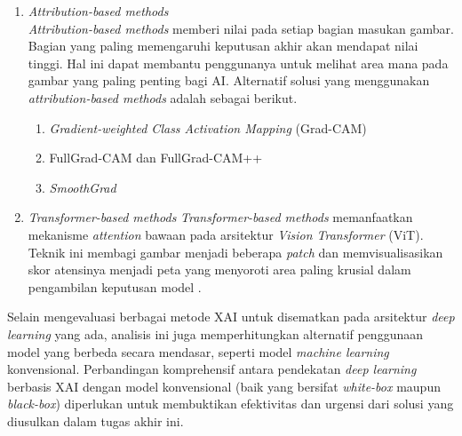 \begin{enumerate}
	\item \textit{Attribution-based methods} \\
	\textit{Attribution-based methods} memberi nilai pada setiap bagian masukan gambar. Bagian yang paling memengaruhi keputusan akhir akan mendapat nilai tinggi. Hal ini dapat membantu penggunanya untuk melihat area mana pada gambar yang paling penting bagi AI. Alternatif solusi yang menggunakan \textit{attribution-based methods} adalah sebagai berikut.
	\begin{enumerate}
		\item \textit{Gradient-weighted Class Activation Mapping} (Grad-CAM)
		
		\item FullGrad-CAM dan FullGrad-CAM++
		
		\item \textit{SmoothGrad}
	\end{enumerate}
	
	\item \textit{Transformer-based methods}
	\textit{Transformer-based methods} memanfaatkan mekanisme \textit{attention} bawaan pada arsitektur \textit{Vision Transformer} (ViT). Teknik ini membagi gambar menjadi beberapa \textit{patch} dan memvisualisasikan skor atensinya menjadi peta yang menyoroti area paling krusial dalam pengambilan keputusan model \autocite{iftikhar2025explainable}.
\end{enumerate}

Selain mengevaluasi berbagai metode XAI untuk disematkan pada arsitektur \textit{deep learning} yang ada, analisis ini juga memperhitungkan alternatif penggunaan model yang berbeda secara mendasar, seperti model \textit{machine learning} konvensional. Perbandingan komprehensif antara pendekatan \textit{deep learning} berbasis XAI dengan model konvensional (baik yang bersifat \textit{white-box} maupun \textit{black-box}) diperlukan untuk membuktikan efektivitas dan urgensi dari solusi yang diusulkan dalam tugas akhir ini.

